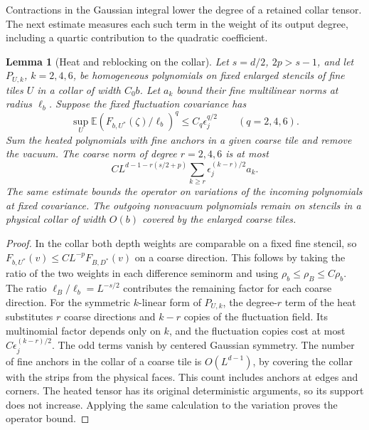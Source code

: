 \documentclass[11pt]{article}
\newtheorem{lemma}[theorem]{Lemma}
\theoremstyle{definition}
\begin{document}
Contractions in the Gaussian integral lower the degree of a retained
collar tensor. The next estimate measures each such term in the
weight of its output degree, including a quartic contribution to
the quadratic coefficient.

\begin{lemma}[Heat and reblocking on the collar]
\label{lem:cube-boundary-heat}
Let \(s=d/2\), \(2p>s-1\), and let \(P_{U,k}\), \(k=2,4,6\),
be homogeneous polynomials on fixed enlarged stencils of fine tiles
\(U\) in a collar of width \(C_0 b\). Let \(a_k\) bound their
fine multilinear norms at radius \(\ell_b\). Suppose the fixed
fluctuation covariance has
\begin{equation}
 \sup_U\mathbb E\left(F_{b,U^*}(\zeta)/\ell_b\right)^q
     \le C_q\epsilon_j^{q/2}\qquad(q=2,4,6).
\end{equation}
Sum the heated polynomials with fine anchors in a given coarse
tile and remove the vacuum. The coarse norm of degree \(r=2,4,6\)
is at most
\begin{equation}
 C L^{d-1-r(s/2+p)}
              \sum_{k\ge r}\epsilon_j^{(k-r)/2}a_k .
\end{equation}
The same estimate bounds the operator on variations of the
incoming polynomials at fixed covariance. The outgoing nonvacuum
polynomials remain on stencils in a physical collar of width
\(O(b)\) covered by the enlarged coarse tiles.
\end{lemma}

\begin{proof}
In the collar both depth weights are comparable on a fixed
fine stencil, so
\(F_{b,U^*}(v)\le C L^{-p}F_{B,D^*}(v)\) on a coarse direction.
This follows by taking the ratio of the two weights in each
difference seminorm and using \(\rho_b\le\rho_B\le C\rho_b\).
The ratio \(\ell_B/\ell_b=L^{-s/2}\) contributes the remaining
factor for each coarse direction. For the symmetric \(k\)-linear
form of \(P_{U,k}\), the degree-\(r\) term of the heat substitutes
\(r\) coarse directions and \(k-r\) copies of the fluctuation
field. Its multinomial factor depends only on \(k\), and the
fluctuation copies cost at most \(C\epsilon_j^{(k-r)/2}\).
The odd terms vanish by centered Gaussian symmetry. The number
of fine anchors in the collar of a coarse tile is \(O(L^{d-1})\),
by covering the collar with the strips from the physical faces.
This count includes anchors at edges and corners. The heated
tensor has its original deterministic arguments, so its support
does not increase. Applying the same calculation to the variation
proves the operator bound.
\end{proof}
\end{document}
